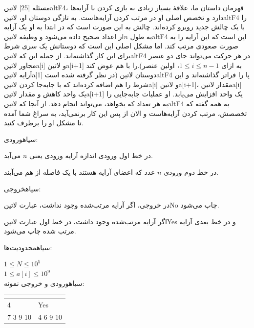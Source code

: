 ‌مسئله [25]
	‌لاتین{altF4}، قهرمان داستان ما، علاقۀ بسیار زیادی به بازی کردن با آرایه‌ها دارد و تخصص اصلی او
	در مرتب کردن آرایه‌هاست. به تازگی دوستان او، ‌لاتین{altF4} را با یک چالش جدید روبرو کرده‌اند.
	چالش به این صورت است که در ابتدا به او یک آرایه به طول $n$از اعداد صحیح داده می‌شود و وظیفه ‌لاتین{altF4}
	این است که این آرایه را به صورت صعودی مرتب کند. اما مشکل اصلی این است که دوستانش یک سری شرط برای 
	این کار گذاشته‌اند. از جمله این که ‌لاتین{altF4} در هر حرکت می‌تواند جای دو عنصر مجاور ‌لاتین{a[i]}	و ‌لاتین{a[i+1]} را با هم عوض کند.(به ازای
	$1 \leq i \leq n-1 $،
	 اولین عنصر آرایه ‌لاتین{a[1]} در نظر گرفته شده است)
	دوستان ‌لاتین{altF4} پا را فراتر گذاشته‌اند و این شرط را هم اضافه کرده‌اند که با جابه‌جا کردن 
	‌لاتین{a[i]} و ‌لاتین{a[i+1]}، مقدار ‌لاتین{a[i]} یک واحد کاهش و مقدار ‌لاتین{a[i+1]} 
	یک واحد افزایش می‌یابد. او عملیات جا‌به‌جایی را به هر تعداد که بخواهد، می‌تواند انجام دهد. از آنجا 
	که ‌لاتین{altF4} به همه گفته که تخصصش، مرتب کردن آرایه‌هاست و الان از پس این کار برنمی‌آید، به
	سراغ شما آمده تا مشکل او را برطرف کنید.
	
	‌سیاه{ورودی:}
	
	در خط اول ورودی اندازه آرایه ورودی یعنی $n$ می‌آید.
	
	در خط دوم ورودی $n$ عدد که اعضای آرایه هستند با یک فاصله از هم می‌آیند.
	
	‌سیاه{خروجی:}
	
	در خروجی، اگر آرایه مرتب‌شده وجود نداشت، عبارت ‌لاتین{No} چاپ می‌شود.
	
	اگر آرایه مرتب‌شده وجود داشت، در خط اول عبارت  ‌لاتین{Yes} و در خط بعدی آرایه مرتب شده چاپ می‌شود.
	
	‌سیاه{محدودیت‌ها:}
	
	$1 \leq N \leq 10^5$\\
	$1 \leq a[i] \leq 10^9$\\
	‌سیاه{ورودی و خروجی نمونه:}
	
	\begin{latin}
		\begin{tabularx}{\textwidth}{|X | X|}
			\hline
			\textbf{\rl{ورودی}} &
			\textbf{\rl{خروجی}}\\
			\hline
			4&
			Yes\\
			7 3 9 10 &
			4 6 9 10\\
			\hline
		
		\end{tabularx}
	\end{latin}

